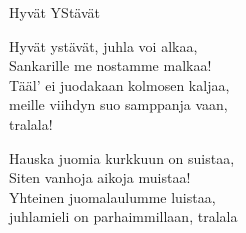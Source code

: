 \begin{song}{Hyvät YStävät}

    Hyvät ystävät, juhla voi alkaa,\\
    Sankarille me nostamme malkaa!\\
    \repetitionbegin{} Tääl’ ei juodakaan kolmosen kaljaa,\\
    meille viihdyn suo samppanja vaan,\\
    tralala! \repetitionend{}

    Hauska juomia kurkkuun on suistaa,\\
    Siten vanhoja aikoja muistaa!\\
    \repetitionbegin{} Yhteinen juomalaulumme luistaa,\\
    juhlamieli on parhaimmillaan, tralala \repetitionend{}

\end{song}